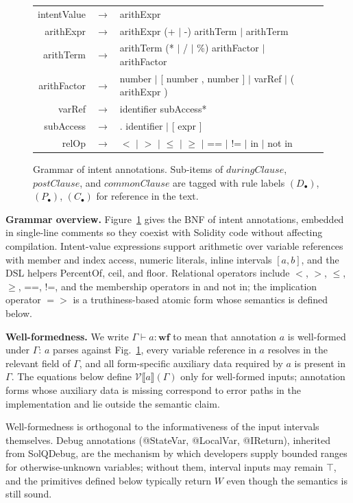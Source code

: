 \documentclass[pdflatex,sn-basic]{sn-jnl}%
\theoremstyle{thmstyleone}%
\theoremstyle{thmstyletwo}%
\theoremstyle{thmstylethree}%
\begin{document}
\begin{figure}[t]
\begin{tabular}{@{}r@{\quad}c@{\quad}l@{\qquad}l@{}}
intentValue & $\rightarrow$ & arithExpr & \\[2pt]
arithExpr   & $\rightarrow$ & arithExpr (+ $|$ -) arithTerm $|$ arithTerm & \\
arithTerm   & $\rightarrow$ & arithTerm (* $|$ / $|$ \%) arithFactor $|$ arithFactor & \\
arithFactor & $\rightarrow$ & number $|$ [ number , number ] $|$ varRef $|$ ( arithExpr ) & \\[2pt]
varRef      & $\rightarrow$ & identifier subAccess* & \\
subAccess   & $\rightarrow$ & . identifier $|$ [ expr ] & \\[6pt]

relOp & $\rightarrow$ & $<$ $|$ $>$ $|$ $\leq$ $|$ $\geq$ $|$ == $|$ != $|$ in $|$ not in & \\
\end{tabular}
\caption{Grammar of intent annotations. Sub-items of $\mathit{duringClause}$, $\mathit{postClause}$, and $\mathit{commonClause}$ are tagged with rule labels $(D_\bullet)$, $(P_\bullet)$, $(C_\bullet)$ for reference in the text.}
\label{fig:intent-grammar}
\end{figure}

\smallskip
\noindent\textbf{Grammar overview.}
Figure~\ref{fig:intent-grammar} gives the BNF of intent annotations, embedded in single-line comments so they coexist with Solidity code without affecting compilation.
Intent-value expressions support arithmetic over variable references with member and index access, numeric literals, inline intervals $[a, b]$, and the DSL helpers PercentOf, ceil, and floor.
Relational operators include $<$, $>$, $\leq$, $\geq$, ==, !=, and the membership operators in and not in; the implication operator ${=}{>}$ is a truthiness-based atomic form whose semantics is defined below.

\smallskip
\noindent\textbf{Well-formedness.}
We write $\Gamma \vdash a : \mathbf{wf}$ to mean that annotation $a$ is well-formed under $\Gamma$: $a$ parses against Fig.~\ref{fig:intent-grammar}, every variable reference in $a$ resolves in the relevant field of $\Gamma$, and all form-specific auxiliary data required by $a$ is present in $\Gamma$.
The equations below define $\mathcal{V}\llbracket a \rrbracket(\Gamma)$ only for well-formed inputs; annotation forms whose auxiliary data is missing correspond to error paths in the implementation and lie outside the semantic claim.

Well-formedness is orthogonal to the informativeness of the input intervals themselves.
Debug annotations (@StateVar, @LocalVar, @IReturn), inherited from SolQDebug, are the mechanism by which developers supply bounded ranges for otherwise-unknown variables; without them, interval inputs may remain $\top$, and the primitives defined below typically return $W$ even though the semantics is still sound.
\end{document}
